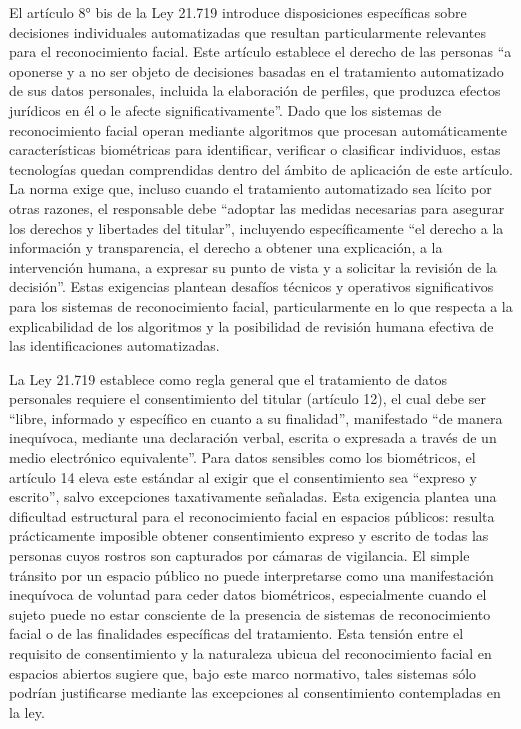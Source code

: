 \documentclass[11pt, a4paper]{article}
\begin{document}
El artículo 8° bis de la Ley 21.719 introduce disposiciones específicas sobre decisiones individuales automatizadas que resultan particularmente relevantes para el reconocimiento facial. Este artículo establece el derecho de las personas ``a oponerse y a no ser objeto de decisiones basadas en el tratamiento automatizado de sus datos personales, incluida la elaboración de perfiles, que produzca efectos jurídicos en él o le afecte significativamente''. Dado que los sistemas de reconocimiento facial operan mediante algoritmos que procesan automáticamente características biométricas para identificar, verificar o clasificar individuos, estas tecnologías quedan comprendidas dentro del ámbito de aplicación de este artículo. La norma exige que, incluso cuando el tratamiento automatizado sea lícito por otras razones, el responsable debe ``adoptar las medidas necesarias para asegurar los derechos y libertades del titular'', incluyendo específicamente ``el derecho a la información y transparencia, el derecho a obtener una explicación, a la intervención humana, a expresar su punto de vista y a solicitar la revisión de la decisión''. Estas exigencias plantean desafíos técnicos y operativos significativos para los sistemas de reconocimiento facial, particularmente en lo que respecta a la explicabilidad de los algoritmos y la posibilidad de revisión humana efectiva de las identificaciones automatizadas.

La Ley 21.719 establece como regla general que el tratamiento de datos personales requiere el consentimiento del titular (artículo 12), el cual debe ser ``libre, informado y específico en cuanto a su finalidad'', manifestado ``de manera inequívoca, mediante una declaración verbal, escrita o expresada a través de un medio electrónico equivalente''. Para datos sensibles como los biométricos, el artículo 14 eleva este estándar al exigir que el consentimiento sea ``expreso y escrito'', salvo excepciones taxativamente señaladas. Esta exigencia plantea una dificultad estructural para el reconocimiento facial en espacios públicos: resulta prácticamente imposible obtener consentimiento expreso y escrito de todas las personas cuyos rostros son capturados por cámaras de vigilancia. El simple tránsito por un espacio público no puede interpretarse como una manifestación inequívoca de voluntad para ceder datos biométricos, especialmente cuando el sujeto puede no estar consciente de la presencia de sistemas de reconocimiento facial o de las finalidades específicas del tratamiento. Esta tensión entre el requisito de consentimiento y la naturaleza ubicua del reconocimiento facial en espacios abiertos sugiere que, bajo este marco normativo, tales sistemas sólo podrían justificarse mediante las excepciones al consentimiento contempladas en la ley.
\end{document}
